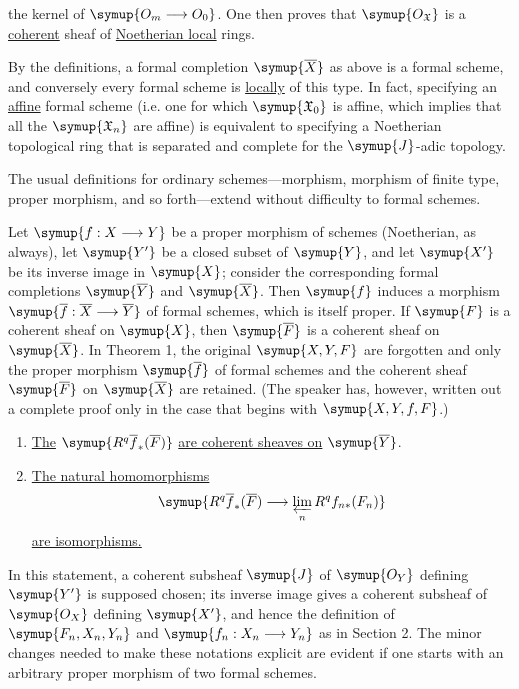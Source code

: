the kernel of $\symup{O_m\longrightarrow O_0}$. One then proves that
$\symup{O_{\mathfrak X}}$ is a \uline{coherent} sheaf of \uline{Noetherian local} rings.

By the definitions, a formal completion $\symup{\overline X}$ as above is a formal
scheme, and conversely every formal scheme is \uline{locally} of this type. In
fact, specifying an \uline{affine} formal scheme (i.e. one for which
$\symup{\mathfrak X_0}$ is affine, which implies that all the $\symup{\mathfrak X_n}$ are
affine) is equivalent to specifying a Noetherian topological ring that is
separated and complete for the $\symup{J}$-adic topology.

The usual definitions for ordinary schemes---morphism, morphism of finite type,
proper morphism, and so forth---extend without difficulty to formal schemes.


Let $\symup{f:X\longrightarrow Y}$ be a proper morphism of schemes (Noetherian, as
always), let $\symup{Y'}$ be a closed subset of $\symup{Y}$, and let $\symup{X'}$ be its inverse image
in $\symup{X}$; consider the corresponding formal completions $\symup{\overline Y}$ and
$\symup{\overline X}$. Then $\symup{f}$ induces a morphism
$\symup{\overline f:\overline X\longrightarrow\overline Y}$ of formal schemes, which
is itself proper. If $\symup{F}$ is a coherent sheaf on $\symup{X}$, then $\symup{\overline F}$ is a
coherent sheaf on $\symup{\overline X}$. In Theorem 1, the original $\symup{X,Y,F}$ are
forgotten and only the proper morphism $\symup{\overline f}$ of formal schemes and the
coherent sheaf $\symup{\overline F}$ on $\symup{\overline X}$ are retained. (The speaker has,
however, written out a complete proof only in the case that begins with
$\symup{X,Y,f,F}$.)

\begin{enumerate}
  \item[\textnormal{i.}] \uline{The} $\symup{R^{q}\overline f_{*}(\overline F)}$ \uline{are coherent
    sheaves on} $\symup{\overline Y}$.
  \item[\textnormal{ii.}] \uline{The natural homomorphisms}
    \[
      \symup{R^{q}\overline f_{*}(\overline F)
      \longrightarrow \varprojlim\limits_n R^{q}f_{n*}(F_n)}
    \]
    \uline{are isomorphisms.}
\end{enumerate}

In this statement, a coherent subsheaf $\symup{J}$ of $\symup{O_Y}$ defining $\symup{Y'}$ is
supposed chosen; its inverse image gives a coherent subsheaf of $\symup{O_X}$
defining $\symup{X'}$, and hence the definition of $\symup{F_n,X_n,Y_n}$ and
$\symup{f_n:X_n\longrightarrow Y_n}$ as in Section 2. The minor changes needed to make
these notations explicit are evident if one starts with an arbitrary proper
morphism of two formal schemes.

